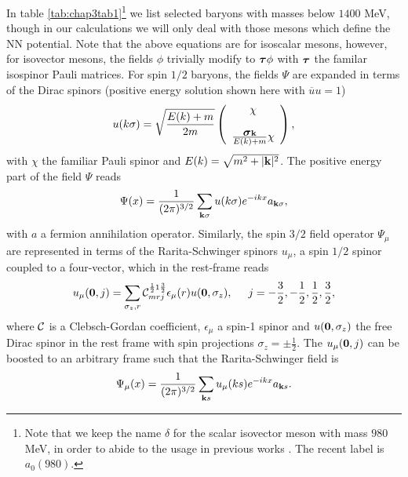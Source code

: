 In table \ref{tab:chap3tab1}\footnote{Note that we keep
the name $\delta$ for the scalar isovector meson with mass $980$ MeV,
in order to abide to the usage in previous works \cite{mac89}. The recent
label is $a_0(980)$.} we list selected baryons with masses below $1400$ MeV,
though in our calculations we will only deal with those mesons which define
the NN potential.
Note that the above equations are for isoscalar mesons, however,
for isovector mesons, the fields $\phi$ trivially modify to
$\mbox{\boldmath $\tau$} \phi$ with
$\mbox{\boldmath $\tau$}$ the familar isospinor Pauli matrices.
For spin $1/2$ baryons, the fields $\Psi$ are expanded
in terms of the Dirac spinors (positive energy
solution shown here with $\overline{u}u=1$)
\begin{equation}
   u(k\sigma)=\sqrt{\frac{E(k)+m}{2m}}
	  \left(\begin{array}{c} \chi\\ \\
	  \frac{\mbox{\boldmath $\sigma$}{\bf k}}{E(k)+m}\chi
	  \end{array}\right), 
   \label{eq:freespinor}
\end{equation}
with $\chi$ the familiar Pauli spinor and $E(k) =\sqrt{m^2 +|{\bf k}|^2}$. 
The positive energy part of the field $\Psi$ reads
\begin{equation}
\Psi (x)={\displaystyle \frac{1}{(2\pi )^{3/2}}
        \sum_{{\bf k}\sigma}u(k\sigma)e^{-ikx}a_{{\bf k}\sigma}},
\end{equation}
with $a$ a fermion annihilation operator.
Similarly, the spin $3/2$ field operator $\Psi_{\mu}$ 
are represented in terms of the Rarita-Schwinger
spinors $u_{\mu}$,
a spin $1/2$ spinor coupled to a four-vector, which in the rest-frame reads
\begin{equation}
   u_{\mu}({\bf 0},j)=
   \sum_{\sigma_z,r}{\cal C}_{mrj}^{\frac{1}{2}1\frac{3}{2}}\epsilon_{\mu}(r)
   u({\bf 0},\sigma_z),\hspace{0.5cm}
          j=-\frac{3}{2},-\frac{1}{2},\frac{1}{2},\frac{3}{2},
   \label{eq:spin32}
\end{equation}
where ${\cal C}$ is a Clebsch-Gordan coefficient,
$\epsilon_{\mu}$ a spin-1 spinor and
$u({\bf 0}, \sigma_z)$ the free Dirac spinor in
the rest frame with spin projections
$\sigma_z=\pm \frac{1}{2}$. The $u_{\mu}({\bf 0},j)$ can be boosted to an
arbitrary frame such that the Rarita-Schwinger field is
\begin{equation}
\Psi_{\mu}(x)={\displaystyle \frac{1}{(2\pi )^{3/2}}
	\sum_{{\bf k}s}u_{\mu}(ks)e^{-ikx}a_{{\bf k}s}}.
\end{equation}
